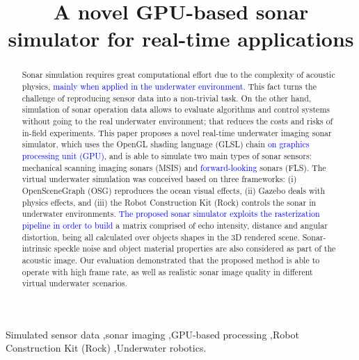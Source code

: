 \documentclass[final,5p,times]{elsarticle}
\begin{document}
\begin{frontmatter}


\title{A novel GPU-based sonar simulator for real-time applications}



\begin{abstract}

Sonar simulation requires great computational effort due to the complexity of
acoustic physics, \textcolor{blue}{mainly when applied in the underwater environment}. This fact turns the challenge of reproducing sensor data into a non-trivial task. On the other hand, simulation of sonar operation data allows to evaluate algorithms and control systems without going to the real underwater environment; that reduces the costs and risks of in-field experiments. This paper proposes a novel real-time underwater imaging sonar simulator, which uses the OpenGL shading language (GLSL) chain \textcolor{blue}{on graphics processing unit (GPU)}, and is able to simulate two main types of sonar sensors: mechanical scanning imaging sonars (MSIS) and \textcolor{blue}{forward-looking} sonars (FLS). The virtual underwater simulation was conceived based on three frameworks: (i) OpenSceneGraph (OSG) reproduces the ocean visual effects, (ii) Gazebo deals with physics effects, and (iii) the Robot Construction Kit (Rock) controls the sonar in underwater environments. \textcolor{blue}{The proposed sonar simulator exploits the rasterization pipeline in order to build} a matrix comprised of echo intensity, distance and angular distortion, being all calculated over objects shapes in the 3D rendered scene. Sonar-intrinsic speckle noise and object material properties are also considered as part of the acoustic image. Our evaluation demonstrated that the proposed method is able to operate with high frame rate, as well as realistic sonar image quality in different virtual underwater scenarios.

\end{abstract}

\begin{keyword}
Simulated sensor data
\sep sonar imaging
\sep GPU-based processing
\sep Robot Construction Kit (Rock)
\sep Underwater robotics.

\end{keyword}

\end{frontmatter}
\end{document}
